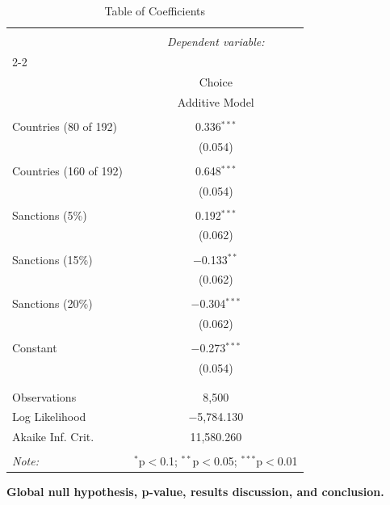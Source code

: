 \documentclass[12pt,letterpaper]{article}
\begin{document}
\begin{enumerate}
\begin{table}[!htbp] \centering 
	\caption{Table of Coefficients} 
	\label{} 
	\begin{tabular}{@{\extracolsep{5pt}}lc} 
		\\[-1.8ex]\hline 
		\hline \\[-1.8ex] 
		& \multicolumn{1}{c}{\textit{Dependent variable:}} \\ 
		\cline{2-2} 
		\\[-1.8ex] & Choice \\ 
		& Additive Model \\ 
		\hline \\[-1.8ex] 
		Countries (80 of 192) & 0.336$^{***}$ \\ 
		& (0.054) \\ 
		& \\ 
		Countries (160 of 192) & 0.648$^{***}$ \\ 
		& (0.054) \\ 
		& \\ 
		Sanctions (5\%) & 0.192$^{***}$ \\ 
		& (0.062) \\ 
		& \\ 
		Sanctions (15\%) & $-$0.133$^{**}$ \\ 
		& (0.062) \\ 
		& \\ 
		Sanctions (20\%) & $-$0.304$^{***}$ \\ 
		& (0.062) \\ 
		& \\ 
		Constant & $-$0.273$^{***}$ \\ 
		& (0.054) \\ 
		& \\ 
		\hline \\[-1.8ex] 
		Observations & 8,500 \\ 
		Log Likelihood & $-$5,784.130 \\ 
		Akaike Inf. Crit. & 11,580.260 \\ 
		\hline 
		\hline \\[-1.8ex] 
		\textit{Note:}  & \multicolumn{1}{r}{$^{*}$p$<$0.1; $^{**}$p$<$0.05; $^{***}$p$<$0.01} \\ 
	\end{tabular} 
		\label{tab:Table1}
	\end{table} 

\newpage

\noindent\textbf{Global null hypothesis, p-value, results discussion, and conclusion.}


\end{enumerate}
\end{document}

